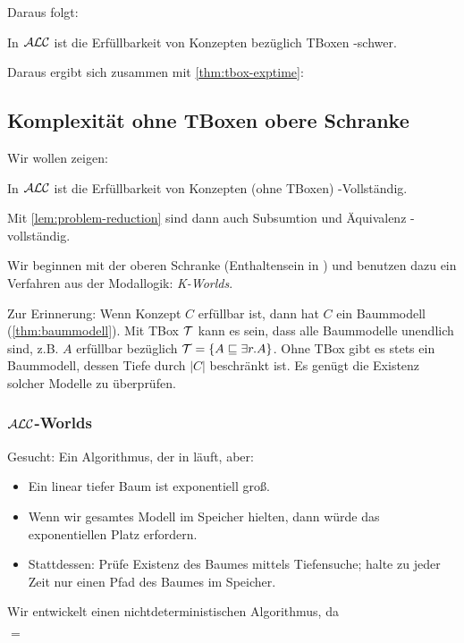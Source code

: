 Daraus folgt:
\begin{theorem}
In $\mathcal{A}\mathcal{L}\mathcal{C}$ ist die Erfüllbarkeit von Konzepten bezüglich TBoxen \ExpTime-schwer.
\end{theorem}

Daraus ergibt sich zusammen mit \autoref{thm:tbox-exptime}:

\subsection{Komplexität ohne TBoxen obere
Schranke}\label{komplexituxe4t-ohne-tboxen-obere-schranke}

Wir wollen zeigen:

\begin{theorem}
In $\mathcal{A}\mathcal{L}\mathcal{C}$ ist die Erfüllbarkeit von Konzepten (ohne TBoxen)
\PSpace-Vollständig.
\end{theorem}
Mit \autoref{lem:problem-reduction} sind dann auch Subsumtion und Äquivalenz \PSpace-vollständig.

Wir beginnen mit der oberen Schranke (Enthaltensein in \PSpace) und benutzen dazu ein Verfahren aus der Modallogik: \emph{K-Worlds}.

Zur Erinnerung: Wenn Konzept $C$ erfüllbar ist, dann hat $C$ ein Baummodell (\autoref{thm:baummodell}). Mit TBox $\mathcal{T}$ kann es sein, dass alle Baummodelle unendlich sind, z.B. $A$ erfüllbar bezüglich $\mathcal{T} = \{A \sqsubseteq \exists r.A\}$. Ohne TBox gibt es stets ein Baummodell, dessen Tiefe durch $|C|$ beschränkt ist. Es genügt die Existenz solcher Modelle zu überprüfen.

\subsubsection{\texorpdfstring{$\mathcal{A}\mathcal{L}\mathcal{C}$}{ALC}-Worlds}\label{alc-worlds}

Gesucht: Ein Algorithmus, der in \PSpace{} läuft, aber:
\begin{itemize}
\item Ein linear tiefer Baum ist exponentiell groß.
\item Wenn wir gesamtes Modell im Speicher hielten, dann würde das exponentiellen Platz erfordern.
\item Stattdessen: Prüfe Existenz des Baumes mittels Tiefensuche; halte zu
  jeder Zeit nur einen Pfad des Baumes im Speicher.
\end{itemize}

Wir entwickelt einen nichtdeterministischen Algorithmus, da
\begin{theorem}[Savitch 1970]
    \PSpace{} $=$ \NPSpace{}
\end{theorem}

